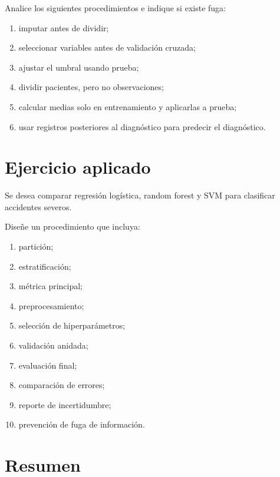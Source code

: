 \documentclass[
  spanish,
  10.5pt,
  letterpaper,
  DIV=11,
  numbers=noendperiod,
  oneside,
  open=any]{scrreprt}
\providecommand{\tightlist}{%
  \setlength{\itemsep}{0pt}\setlength{\parskip}{0pt}}
\theoremstyle{definition}
\theoremstyle{definition}
\theoremstyle{plain}
\theoremstyle{remark}
\begin{document}

Analice los siguientes procedimientos e indique si existe fuga:

\begin{enumerate}
\def\labelenumi{\arabic{enumi}.}
\tightlist
\item
  imputar antes de dividir;
\item
  seleccionar variables antes de validación cruzada;
\item
  ajustar el umbral usando prueba;
\item
  dividir pacientes, pero no observaciones;
\item
  calcular medias solo en entrenamiento y aplicarlas a prueba;
\item
  usar registros posteriores al diagnóstico para predecir el
  diagnóstico.
\end{enumerate}

\section*{Ejercicio aplicado}\label{ejercicio-aplicado-4}


Se desea comparar regresión logística, random forest y SVM para
clasificar accidentes severos.

Diseñe un procedimiento que incluya:

\begin{enumerate}
\def\labelenumi{\arabic{enumi}.}
\tightlist
\item
  partición;
\item
  estratificación;
\item
  métrica principal;
\item
  preprocesamiento;
\item
  selección de hiperparámetros;
\item
  validación anidada;
\item
  evaluación final;
\item
  comparación de errores;
\item
  reporte de incertidumbre;
\item
  prevención de fuga de información.
\end{enumerate}

\section*{Resumen}\label{resumen-6}
\end{document}

